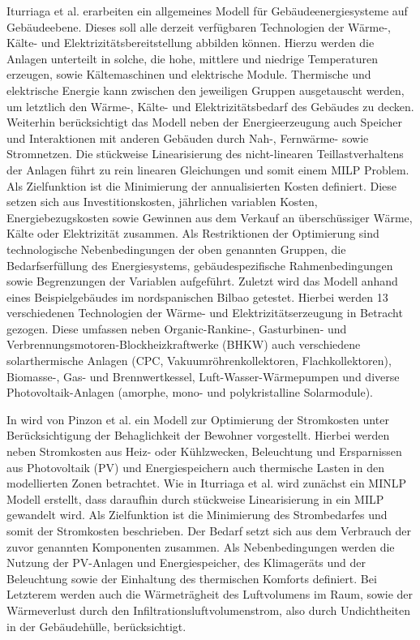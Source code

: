 Iturriaga et al. \cite{Iturriaga.2017} erarbeiten ein allgemeines Modell für Gebäudeenergiesysteme auf Gebäudeebene. 
Dieses soll alle derzeit verfügbaren Technologien der Wärme-, Kälte- und Elektrizitätsbereitstellung abbilden können.
Hierzu werden die Anlagen unterteilt in solche, die hohe, mittlere und niedrige Temperaturen erzeugen, sowie Kältemaschinen und elektrische Module.
Thermische und elektrische Energie kann zwischen den jeweiligen Gruppen ausgetauscht werden, um letztlich den Wärme-, Kälte- und Elektrizitätsbedarf des Gebäudes zu decken.
Weiterhin berücksichtigt das Modell neben der Energieerzeugung auch Speicher und Interaktionen mit anderen Gebäuden durch Nah-, Fernwärme- sowie Stromnetzen.
Die stückweise Linearisierung des nicht-linearen Teillastverhaltens der Anlagen führt zu rein linearen Gleichungen und somit einem MILP Problem.
Als Zielfunktion ist die Minimierung der annualisierten Kosten definiert. 
Diese setzen sich aus Investitionskosten, jährlichen variablen Kosten, Energiebezugskosten sowie Gewinnen aus dem Verkauf an überschüssiger Wärme, Kälte oder Elektrizität zusammen.
Als Restriktionen der Optimierung sind technologische Nebenbedingungen der oben genannten Gruppen, die Bedarfserfüllung des Energiesystems, gebäudespezifische Rahmenbedingungen sowie Begrenzungen der Variablen aufgeführt.
Zuletzt wird das Modell anhand eines Beispielgebäudes im nordspanischen Bilbao getestet.
Hierbei werden 13 verschiedenen Technologien der Wärme- und Elektrizitätserzeugung in Betracht gezogen.
Diese umfassen neben Organic-Rankine-, Gasturbinen- und Verbrennungsmotoren-Blockheizkraftwerke (BHKW) auch verschiedene solarthermische Anlagen (CPC, Vakuumröhrenkollektoren, Flachkollektoren), Biomasse-, Gas- und Brennwertkessel, Luft-Wasser-Wärmepumpen und diverse Photovoltaik-Anlagen (amorphe, mono- und polykristalline Solarmodule).

In \cite{Pinzon.23.04.201726.04.2017} wird von Pinzon et al. ein Modell zur Optimierung der Stromkosten unter Berücksichtigung der Behaglichkeit der Bewohner vorgestellt.
Hierbei werden neben Stromkosten aus Heiz- oder Kühlzwecken, Beleuchtung und Ersparnissen aus Photovoltaik (PV) und Energiespeichern auch thermische Lasten in den modellierten Zonen betrachtet.
Wie in Iturriaga et al. \cite{Iturriaga.2017} wird zunächst ein MINLP Modell erstellt, dass daraufhin durch stückweise Linearisierung in ein MILP gewandelt wird.
Als Zielfunktion ist die Minimierung des Strombedarfes und somit der Stromkosten beschrieben.
Der Bedarf setzt sich aus dem Verbrauch der zuvor genannten Komponenten zusammen.
Als Nebenbedingungen werden die Nutzung der PV-Anlagen und Energiespeicher, des Klimageräts und der Beleuchtung sowie der Einhaltung des thermischen Komforts definiert.
Bei Letzterem werden auch die Wärmeträgheit des Luftvolumens im Raum, sowie der Wärmeverlust durch den Infiltrationsluftvolumenstrom, also durch Undichtheiten in der Gebäudehülle, berücksichtigt.


